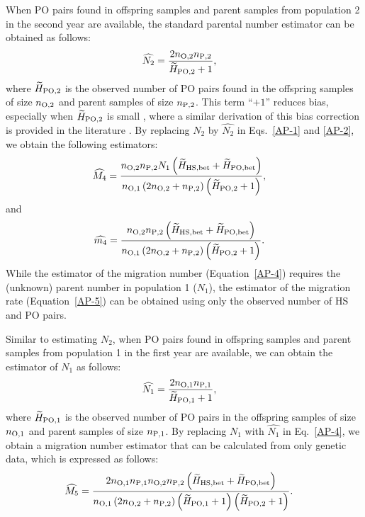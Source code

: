 \documentclass[12pt, English]{article}
\begin{document}
\begin{spacing}{1.9}
When PO pairs found in offspring samples and parent samples from population 2 in the second year are available, the standard parental number estimator can be obtained \cite[]{bravington2016close} as follows: 
\begin{align}
\widehat{N_2} &= \frac{ 2 n_{\rm O, 2} n_{\rm P, 2}  }{\widetilde{H}_{\rm PO, 2} + 1} ,
\label{AP-3}
\end{align}
where $\widetilde{H}_{\rm PO, 2}$ is the observed number of PO pairs found in the offspring samples of size $n_{\rm O, 2}$ and parent samples of size $n_{\rm P, 2}$. This term ``$+1$'' reduces bias, especially when $\widetilde{H}_{\rm PO, 2}$ is small \cite[e.g.,][]{ecolevol2021p}, where a similar derivation of this bias correction is provided in the literature \cite{Akita_2019}. By replacing $N_2$ by $\widehat{N_2}$ in Eqs.~\ref{AP-1} and \ref{AP-2}, we obtain the following estimators: 
\begin{align}
\widehat{M_4} &=  \frac{ n_{\rm O, 2} n_{\rm P, 2} N_{1} \left(\widetilde{H}_{\rm HS,bet} + \widetilde{H}_{\rm PO,bet}\right) } {n_{\rm O, 1} \left(2 n_{\rm O, 2} + n_{\rm P, 2}\right) \left(\widetilde{H}_{\rm PO, 2} + 1\right)},
\label{AP-4}
\end{align}
and
\begin{align}
\widehat{m_4} &=  \frac{ n_{\rm O, 2} n_{\rm P, 2}\left(\widetilde{H}_{\rm HS,bet} + \widetilde{H}_{\rm PO,bet}\right)} {n_{\rm O, 1} \left(2 n_{\rm O, 2} + n_{\rm P, 2}\right) \left(\widetilde{H}_{\rm PO, 2} + 1\right)}.
\label{AP-5}
\end{align}
While the estimator of the migration number (Equation~\ref{AP-4}) requires the (unknown) parent number in population 1 ($N_{1}$), the estimator of the migration rate (Equation~\ref{AP-5}) can be obtained using only the observed number of HS and PO pairs. 

Similar to estimating $N_2$, when PO pairs found in offspring samples and parent samples from population 1 in the first year are available, we can obtain the estimator of $N_1$ as follows:
\begin{align}
\widehat{N_1} &= \frac{ 2 n_{\rm O, 1} n_{\rm P, 1} }{\widetilde{H}_{\rm PO, 1} +1},
\label{AP-6}
\end{align}
where $\widetilde{H}_{\rm PO, 1}$ is the observed number of PO pairs in the offspring samples of size $n_{\rm O, 1}$ and parent samples of size $n_{\rm P, 1}$. By replacing $N_1$ with $\widehat{N_1}$ in Eq.~\ref{AP-4}, we obtain a migration number estimator that can be calculated from only genetic data, which is expressed as follows:
\begin{align}
\widehat{M_5} &=  \frac{ 2 n_{\rm O, 1} n_{\rm P, 1} n_{\rm O, 2} n_{\rm P, 2} \left(\widetilde{H}_{\rm HS,bet} + \widetilde{H}_{\rm PO,bet}\right)} {n_{\rm O, 1} \left(2 n_{\rm O, 2} + n_{\rm P, 2}\right) \left(\widetilde{H}_{\rm PO, 1} + 1\right) \left(\widetilde{H}_{\rm PO, 2} + 1\right)}.
\label{AP-7}
\end{align}


\end{spacing}
\end{document}
